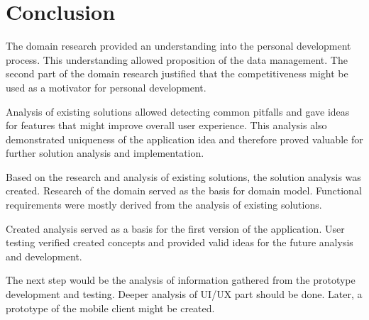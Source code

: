 
\chapter{Conclusion}\label{ch:conclusion}

The domain research provided an understanding into the personal development process.
This understanding allowed proposition of the data management.
The second part of the domain research justified that the competitiveness might be used as a motivator for personal development.

Analysis of existing solutions allowed detecting common pitfalls and gave ideas for features that might improve overall user experience.
This analysis also demonstrated uniqueness of the application idea and therefore proved valuable for further solution analysis and implementation.

Based on the research and analysis of existing solutions, the solution analysis was created.
Research of the domain served as the basis for domain model.
Functional requirements were mostly derived from the analysis of existing solutions.

Created analysis served as a basis for the first version of the application.
User testing verified created concepts and provided valid ideas for the future analysis and development.

The next step would be the analysis of information gathered from the prototype development and testing.
Deeper analysis of UI/UX part should be done.
Later, a prototype of the mobile client might be created.